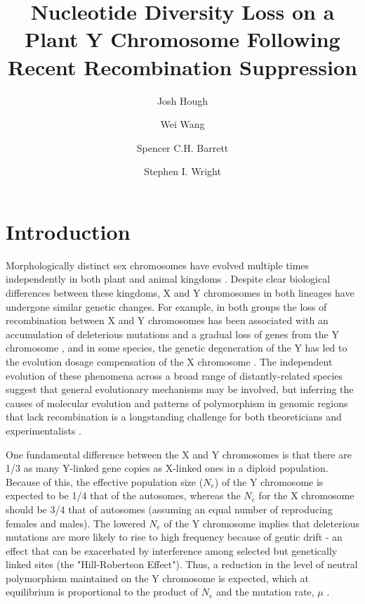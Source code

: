 \documentclass[9pt,twocolumn,twoside]{gsajnl}
\title{Nucleotide Diversity Loss on a Plant Y Chromosome Following Recent Recombination Suppression}
\author[$\ast$,$\dagger$,1]{Josh Hough}
\author[$\dagger$]{Wei Wang}
\author[$\dagger$]{Spencer C.H. Barrett}
\author[$\dagger$]{Stephen I. Wright}
\affil[$\ast$]{Department of Plant Sciences, University of California, Davis}
\affil[$\dagger$]{Department of Ecology and Evolutionary Biology, University of Toronto}
\begin{document}
\maketitle
\thispagestyle{firststyle}
\marginmark
\firstpagefootnote
{}
\vspace{-11pt}

\section*{Introduction}

\lettrine[lines=2]{\color{color2}M}{}orphologically distinct sex chromosomes have evolved multiple times independently in both plant and animal kingdoms \citep{westergaard1958,ohno1967,bull1983,charlesworth1991}. Despite clear biological differences between these kingdoms, X and Y chromosomes in both lineages have undergone similar genetic changes. For example, in both groups the loss of recombination between X and Y chromosomes has been associated with an accumulation of deleterious mutations and a gradual loss of genes from the Y chromosome \citep{hough2014,bergero2015,bachtrog2013NRG}, and in some species, the genetic degeneration of the Y has led to the evolution dosage compensation of the X chromosome \citep{charlesworth1996CB,muyle2012,mank2013sex,papadopulos2015}. The independent evolution of these phenomena across a broad range of distantly-related species suggest that general evolutionary mechanisms may be involved, but inferring the causes of molecular evolution and patterns of polymorphism in genomic regions that lack recombination is a longstanding challenge for both theoreticians and experimentalists \citep{charlesworth1978,feldman1980evolution,barton1995general,charlesworth1996CB,otto1997deleterious,charlesworth2000degeneration,mcvean2000effects}.

One fundamental difference between the X and Y chromosomes is that there are 1/3 as many Y-linked gene copies as X-linked ones in a diploid population. Because of this, the effective population size ($N_{e}$) of the Y chromosome is expected to be 1/4 that of the autosomes, whereas the $N_{e}$ for the X chromosome should be 3/4 that of autosomes (assuming an equal number of reproducing females and males). The lowered $N_{e}$ of the Y chromosome implies that deleterious mutations are more likely to rise to high frequency because of gentic drift \citep{nei1981genetic} - an effect that can be exacerbated by interference among selected but genetically linked sites (the "Hill-Robertson Effect"). Thus, a reduction in the level of neutral polymorphism maintained on the Y chromosome is expected, which at equilibrium is proportional to the product of $N_{e}$ and the mutation rate, $\mu$ \citep{Kimura1984,charlesworth1987}.
\end{document}
